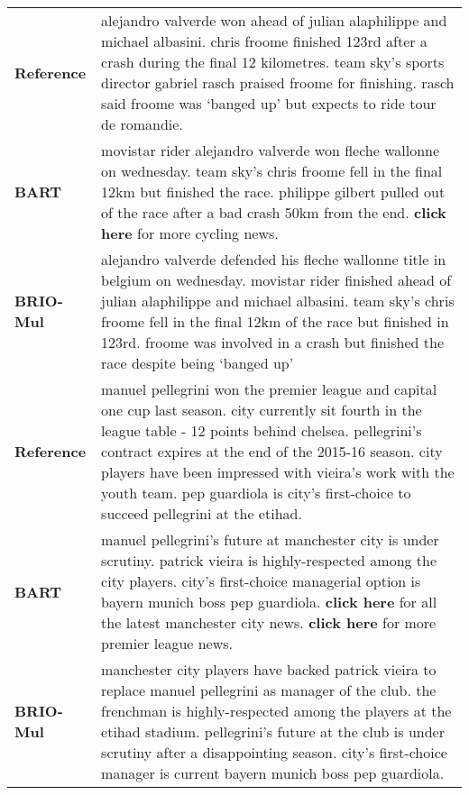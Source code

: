 \documentclass[11pt]{article}
\newcommand{\model}{BRIO\xspace}
\begin{document}
\begin{table*}[t!]
\begin{tabular}{@{} c  p{}}
\midrule
   \multicolumn{1}{l}{ \bf Reference} & \cellcolor{gray!25} alejandro valverde won ahead of julian alaphilippe and michael albasini. chris froome finished 123rd after a crash during the final 12 kilometres. team sky's sports director gabriel rasch praised froome for finishing. rasch said froome was `banged up' but expects to ride tour de romandie. \\
    \multicolumn{1}{l}{ \bf BART }&  movistar rider alejandro valverde won fleche wallonne on wednesday. team sky's chris froome fell in the final 12km but finished the race. philippe gilbert pulled out of the race after a bad crash 50km from the end. \textbf{click here} for more cycling news. \\
    \multicolumn{1}{l}{ \bf \model-Mul} & \cellcolor{gray!25} alejandro valverde defended his fleche wallonne title in belgium on wednesday. movistar rider finished ahead of julian alaphilippe and michael albasini. team sky's chris froome fell in the final 12km of the race but finished in 123rd. froome was involved in a crash but finished the race despite being `banged up' \\
\midrule
\multicolumn{1}{l}{ \bf Reference} & \cellcolor{gray!25} manuel pellegrini won the premier league and capital one cup last season. city currently sit fourth in the league table - 12 points behind chelsea. pellegrini's contract expires at the end of the 2015-16 season. city players have been impressed with vieira's work with the youth team. pep guardiola is city's first-choice to succeed pellegrini at the etihad. \\
   \multicolumn{1}{l}{ \bf BART} &  manuel pellegrini's future at manchester city is under scrutiny. patrick vieira is highly-respected among the city players. city's first-choice managerial option is bayern munich boss pep guardiola. \textbf{click here} for all the latest manchester city news. \textbf{click here} for more premier league news. \\
    \multicolumn{1}{l}{ \bf \model-Mul }& \cellcolor{gray!25} manchester city players have backed patrick vieira to replace manuel pellegrini as manager of the club. the frenchman is highly-respected among the players at the etihad stadium. pellegrini's future at the club is under scrutiny after a disappointing season. city's first-choice manager is current bayern munich boss pep guardiola. \\
    
  \bottomrule
\end{tabular}
\vspace{-5pt}
\caption{Case Study on \texttt{CNNDM}. \model-Mul learns to ignore the noise pattern (``click here") while BART cannot.}
\vspace{-8pt}
\label{tab:example}
\end{table*}
\end{document}
